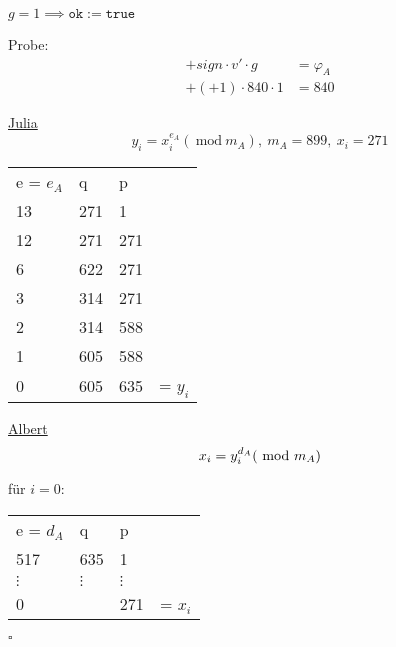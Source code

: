 \documentclass[a4paper, ngerman, landscape, fleqn]{article}
\newcommand{\Mod}{\ \mathrm{mod}\ }
\begin{document}
\begin{multicols*}{3}
$g = 1 \implies \mathtt{ok} := \mathtt{true}$

Probe:
\begin{align*}
    + sign\cdot v' \cdot g &= \varphi_A \\
    +(+1)\cdot 840 \cdot 1 &= 840
\end{align*}

\underline{Julia}
\begin{equation*}
    y_i = x_i^{e_A} (\Mod m_A), \ m_A = 899, \ x_i = 271
\end{equation*}

\begin{tabularx}{\linewidth}{YYYl}
    e = $e_A$ & q & p & \\
    13 & 271 &   1 & \\
    12 & 271 & 271 & \\
     6 & 622 & 271 & \\
     3 & 314 & 271 & \\
     2 & 314 & 588 & \\
     1 & 605 & 588 & \\
     0 & 605 & 635 & = $y_i$ \\
\end{tabularx}

\underline{Albert}
\begin{equation*}
    x_i = y_i^{d_A} (\Mod m_A) \\
\end{equation*}

für $i=0$:
\vspace{1.5ex}

\begin{tabularx}{\linewidth}{YYYl}
    e = $d_A$ & q & p & \\
    517 & 635 & 1 & \\
    $\vdots$ & $\vdots$ & $\vdots$ & \\
     0 & & 271 & = $x_i$ \\
\end{tabularx}

$\square$

\end{multicols*}
\end{document}
